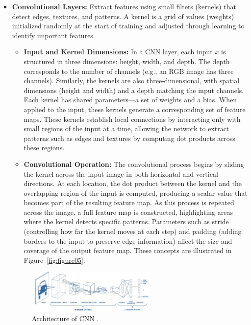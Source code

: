 \begin{itemize}
    \item \textbf{Convolutional Layers:} Extract features using small filters (kernels) that detect edges, textures, and patterns. A kernel is a grid of values (weights) initialized randomly at the start of training and adjusted through learning to identify important features.
     
     \begin{itemize}
        \item \textbf{Input and Kernel Dimensions:} In a CNN layer, each input $x$ is structured in three dimensions: height, width, and depth. The depth corresponds to the number of channels (e.g., an RGB image has three channels). Similarly, the kernels are also three-dimensional, with spatial dimensions (height and width) and a depth matching the input channels. Each kernel has shared parameters---a set of weights and a bias. When applied to the input, these kernels generate a corresponding set of feature maps. These kernels establish local connections by interacting only with small regions of the input at a time, allowing the network to extract patterns such as edges and textures by computing dot products across these regions.
        \item \textbf{Convolutional Operation:} The convolutional process begins by sliding the kernel across the input image in both horizontal and vertical directions. At each location, the dot product between the kernel and the overlapping region of the input is computed, producing a scalar value that becomes part of the resulting feature map. As this process is repeated across the image, a full feature map is constructed, highlighting areas where the kernel detects specific patterns. Parameters such as stride (controlling how far the kernel moves at each step) and padding (adding borders to the input to preserve edge information) affect the size and coverage of the output feature map. These concepts are illustrated in Figure~\ref{fig:figure05}.
     \end{itemize}   
    
     \begin{figure}[H] %
        \centering
        \includegraphics[width=0.6\textwidth]{chapters/chapter1/images/Figure04.png}
        \caption{Architecture of CNN \cite{purwono2022understanding}.}
        \label{fig:figure04}
    \end{figure}
    

\end{itemize}
